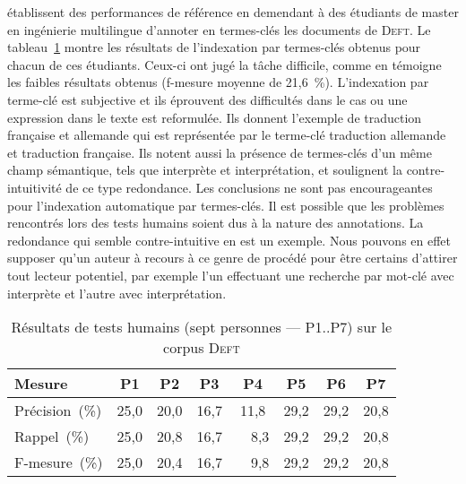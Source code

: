      établissent des performances de référence en
    demendant à des étudiants de master en ingénierie multilingue d'annoter en
    termes-clés les documents de \textsc{Deft}. Le
    tableau~\ref{tab:deft_human_tests} montre les résultats de l'indexation par
    termes-clés obtenus pour chacun de ces étudiants. Ceux-ci ont jugé la tâche
    difficile, comme en témoigne les faibles résultats obtenus (f-mesure moyenne
    de 21,6~\%). L'indexation par terme-clé est subjective et ils éprouvent des
    difficultés dans le cas ou une expression dans le texte est reformulée. Ils
    donnent l'exemple de \og{}traduction française et allemande\fg{} qui est
    représentée par le terme-clé \og{}traduction allemande et traduction
    française\fg{}. Ils notent aussi la présence de termes-clés d'un même champ
    sémantique, tels que \og{}interprète\fg{} et \og{}interprétation\fg{}, et
    soulignent la contre-intuitivité de ce type redondance. Les conclusions ne
    sont pas encourageantes pour l'indexation automatique par termes-clés. Il
    est possible que les problèmes rencontrés lors des tests humains soient dus
    à la nature des annotations. La redondance qui semble contre-intuitive en
    est un exemple. Nous pouvons en effet supposer qu'un auteur à recours à ce
    genre de procédé pour être certains d'attirer tout lecteur potentiel, par
    exemple l'un effectuant une recherche par mot-clé avec \og{}interprète\fg{}
    et l'autre avec \og{}interprétation\fg{}.
    \begin{table}[!h]
      \centering
      \begin{tabular}{l|ccccccc}
        \toprule
          \textbf{Mesure} & \textbf{P1} & \textbf{P2} & \textbf{P3} & \textbf{P4} & \textbf{P5} & \textbf{P6} & \textbf{P7}\\
        \hline
        Précision~\hfill(\%) & 25,0 & 20,0 & 16,7 & 11,8 & 29,2 & 29,2 & 20,8\\
        Rappel~\hfill(\%) & 25,0 & 20,8 & 16,7 & ~~8,3 & 29,2 & 29,2 & 20,8\\
        F-mesure~\hfill(\%) & 25,0 & 20,4 & 16,7 & ~~9,8 & 29,2 & 29,2 & 20,8\\
        \bottomrule
      \end{tabular}
      \caption[Résultats de tests humains sur le corpus \textsc{Deft}]{
        Résultats de tests humains (sept personnes --- P1$..$P7) sur le corpus
        \textsc{Deft}
        \label{tab:deft_human_tests}
      }
    \end{table}

